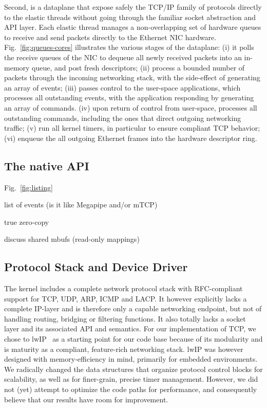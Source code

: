 Second, \ix is a dataplane that expose safely the TCP/IP family of
protocols directly to the elastic threads without going through the
familiar socket abstraction and API layer.  Each elastic thread
manages a non-overlapping set of hardware queues to receive and send
packets directly to the Ethernet NIC hardware.
Fig.~\ref{fig:queues-cores} illustrates the various stages of the \ix
dataplane: (i) it polls the receive queues of the NIC to dequeue all
newly received packets into an in-memory queue, and post fresh
descriptors; (ii) process a bounded number of packets through the
incoming networking stack, with the side-effect of generating an
array of events; (iii) passes control to the user-space applications,
which processes all outstanding events, with the application
responding by generating an array of \ix commands.  (iv) upon return
of control from user-space, \ix processes all outstanding commands,
including the ones that direct outgoing networking traffic; (v) run
all kernel timers, in particular to ensure compliant TCP behavior;
(vi) enqueue the all outgoing Ethernet frames into the hardware
descriptor ring.


\subsection{The \ix native API}
\label{sec:impl:api}



\todo Fig.~\ref{fig:listing} 


\todo list of events (is it like Megapipe and/or mTCP)

\todo  true zero-copy

\todo discuss shared mbufs (read-only mappings)

\subsection{Protocol Stack and Device Driver}
\label{sec:impl:stack}

The \ix kernel includes a complete network protocol stack with
RFC-compliant support for TCP, UDP, ARP, ICMP and LACP.  It however
explicitly lacks a complete IP-layer and is therefore only a capable
networking endpoint, but not of handling routing, bridging or
filtering functions.  It also totally lacks a socket layer and its
associated API and semantics.  For our implementation of TCP, we chose
to lwIP~\cite{dunkels2001design} as a starting point for our code base because of its
modularity and is maturity as a compliant, feature-rich networking
stack.  lwIP was however designed with memory-efficiency in mind,
primarily for embedded environments.  We radically changed the data
structures that organize protocol control blocks for scalability, as
well as for finer-grain, precise timer management.  However, we did
not (yet) attempt to optimize the code paths for performance, and
consequently believe that our results have room for improvement.

